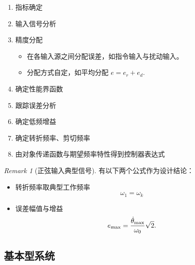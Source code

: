 \documentclass[14pt,a4paper]{article}
\theoremstyle{plain}
\theoremstyle{definition}
\theoremstyle{remark}
\newtheorem{rmk}{Remark}[section]
\theoremstyle{plain}
\theoremstyle{plain}
\theoremstyle{definition}
\begin{document}
			\begin{enumerate}
				\item 指标确定
				\item 输入信号分析
				\item 精度分配
					\begin{itemize}
						\item 在各输入源之间分配误差，如指令输入与扰动输入。
						\item 分配方式自定，如平均分配 $e = e_r + e_d$. 
					\end{itemize} 
				\item 确定性能界函数 
				\item 跟踪误差分析 
				\item 确定低频增益
				\item 确定转折频率、剪切频率
				\item 由对象传递函数与期望频率特性得到控制器表达式
			\end{enumerate} 
	
		\begin{rmk}[正弦输入典型信号]  
		\label{rmk:正弦输入典型信号}
			有以下两个公式作为设计结论：
			\begin{itemize}
				\item 转折频率取典型工作频率
					\[
					\omega_1 = \omega_{k}
					\] 
				\item 误差幅值与增益
					\[
					e_\textnormal{max} = \dfrac{\dot \theta_\textnormal{max} }{\omega_0} \sqrt{2} 
					.\] 
			\end{itemize}  
		\end{rmk} 

		\subsection{基本\uppercase\expandafter{}型系统}%
		\label{sub:基本II型系统} 
\end{document}

